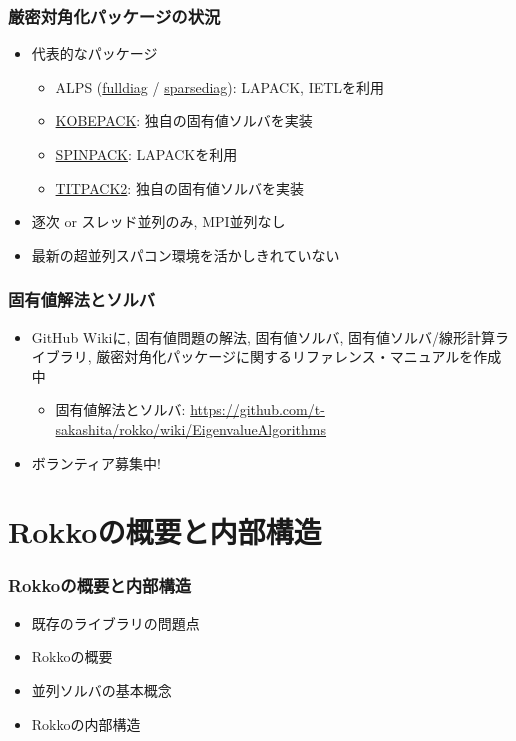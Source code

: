 \begin{frame}
  \frametitle{厳密対角化パッケージの状況}
  \begin{itemize}
    \setlength{\itemsep}{1em}
  \item 代表的なパッケージ
    \begin{itemize}
    \item ALPS (\href{http://alps.comp-phys.org/static/software/applications/diag/fulldiag/doc/}{fulldiag} / \href{http://alps.comp-phys.org/mediawiki/index.php/Documentation:sparsediag}{sparsediag}): LAPACK, IETLを利用
    \item \href{http://quattro.phys.sci.kobe-u.ac.jp/Kobe_Pack/Kobe_Pack.html}{KOBEPACK}: 独自の固有値ソルバを実装
    \item \href{http://www-e.uni-magdeburg.de/jschulen/spin/}{SPINPACK}: LAPACKを利用
    \item \href{http://www.noc.titech.ac.jp/~phys0016_nishimori/titpack2_new/index-e.html}{TITPACK2}: 独自の固有値ソルバを実装
    \end{itemize}
  \item 逐次 or スレッド並列のみ, MPI並列なし
  \item 最新の超並列スパコン環境を活かしきれていない
  \end{itemize}
\end{frame}

\begin{frame}
  \frametitle{固有値解法とソルバ}
  \begin{itemize}
    \setlength{\itemsep}{1em}
    \item GitHub Wikiに, 固有値問題の解法, 固有値ソルバ, 固有値ソルバ/線形計算ライブラリ, 厳密対角化パッケージに関するリファレンス・マニュアルを作成中
      \begin{itemize}
        \item 固有値解法とソルバ: \url{https://github.com/t-sakashita/rokko/wiki/EigenvalueAlgorithms}
      \end{itemize}
    \item ボランティア募集中!
  \end{itemize}
\end{frame}
        
\section{Rokkoの概要と内部構造}

\begin{frame}
  \frametitle{Rokkoの概要と内部構造}
  \begin{itemize}
    \setlength{\itemsep}{1em}
  \item 既存のライブラリの問題点
  \item Rokkoの概要
  \item 並列ソルバの基本概念
  \item Rokkoの内部構造
  \end{itemize}
\end{frame}


